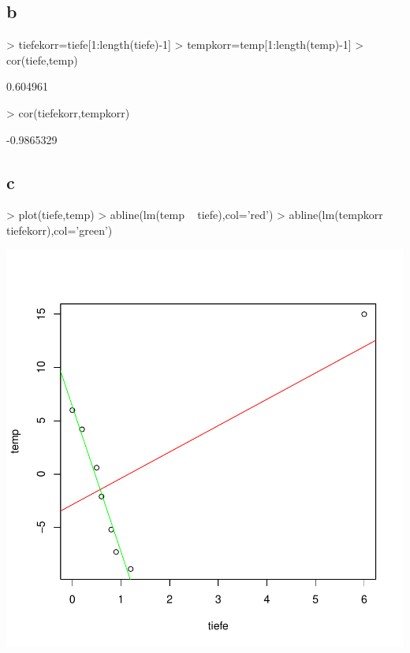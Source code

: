 \subsection{b}
\begin{Schunk}
\begin{Sinput}
> tiefekorr=tiefe[1:length(tiefe)-1]
> tempkorr=temp[1:length(temp)-1]
> cor(tiefe,temp)
\end{Sinput}
\begin{Soutput}
[1] 0.604961
\end{Soutput}
\begin{Sinput}
> cor(tiefekorr,tempkorr)
\end{Sinput}
\begin{Soutput}
[1] -0.9865329
\end{Soutput}
\end{Schunk}

\subsection{c}
\begin{Schunk}
\begin{Sinput}
> plot(tiefe,temp)
> abline(lm(temp ~ tiefe),col='red')
> abline(lm(tempkorr ~ tiefekorr),col='green')
\end{Sinput}
\end{Schunk}
\includegraphics{sw11_4-004}
